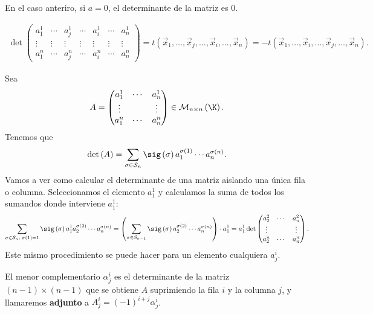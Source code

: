 \begin{observation}
\normalfont En el caso anteriro, si $\displaystyle a = 0 $, el determinante de la matriz es 0.
\end{observation}

\begin{observation}
\normalfont 
\[
\begin{split}
	\det\begin{pmatrix} a^{1}_{1} & \cdots & a^{1}_{j} & \cdots & a^{1}_{i} & \cdots & a^{1}_{n}\\
	\vdots & \vdots & \vdots & \vdots & \vdots & \vdots & \vdots \\
a^{n}_{1} & \cdots & a^{n}_{j} & \cdots & a^{n}_{i} & \cdots & a^{n}_{n}\end{pmatrix} = t\left(\vec{x}_{1}, \ldots, \vec{x}_{j}, \ldots, \vec{x}_{i}, \ldots, \vec{x}_{n}\right) = - t\left(\vec{x}_{1}, \ldots, \vec{x}_{i}, \ldots, \vec{x}_{j}, \ldots, \vec{x}_{n}\right) .
\end{split}
\]
\end{observation}

Sea 
\[A = \begin{pmatrix} a^{1}_{1} & \cdots & a^{1}_{n}\\
\vdots & & \vdots \\
a^{n}_{1} & \cdots & a^{n}_{n}\end{pmatrix} \in \mathcal{M}_{n \times n}\left(\K\right) .\]
Tenemos que 
\[\det\left(A\right) = \sum_{\sigma \in \mathcal{S}_{n}} \sig\left(\sigma \right)a_{1}^{\sigma\left(1\right)}\cdots a^{\sigma\left(n\right)}_{n}.\]
Vamos a ver como calcular el determinante de una matriz aislando una única fila o columna. Seleccionamos el elemento $\displaystyle a_{1}^{1} $ y calculamos la suma de todos los sumandos donde interviene $\displaystyle a^{1}_{1} $:
\[ \sum_{\sigma \in \mathcal{S}_{n}, \; \sigma\left(1\right) = 1} \sig\left(\sigma \right)a^{1}_{1}a^{\sigma\left(2\right)}_{2} \cdots a^{\sigma\left(n\right)}_{n} = \left(\sum_{\sigma \in \mathcal{S}_{n-1}}\sig\left(\sigma \right)a^{\sigma\left(2\right)}_{2} \cdots a^{\sigma\left(n\right)}_{n}\right) \cdot a_{1}^{1} = a^{1}_{1} \det \begin{pmatrix} a^{2}_{2} & \cdots & a^{2}_{n}\\
\vdots & & \vdots \\
a^{n}_{2} & \cdots & a^{n}_{n}\end{pmatrix}.\]
Este mismo procedimiento se puede hacer para un elemento cualquiera $\displaystyle a^{i}_{j} $.
\begin{fdefinition}[Adjunto]
\normalfont  El menor complementario $\displaystyle \alpha^{i}_{j} $ es el determinante de la matriz $\displaystyle \left(n - 1\right) \times \left(n - 1\right) $ que se obtiene $\displaystyle A $ suprimiendo la fila $\displaystyle i $ y la columna $\displaystyle j $, y llamaremos \textbf{adjunto} a $\displaystyle A^{i}_{j} = \left(-1\right)^{i+j}\alpha^{i}_{j} $. 
\end{fdefinition}


